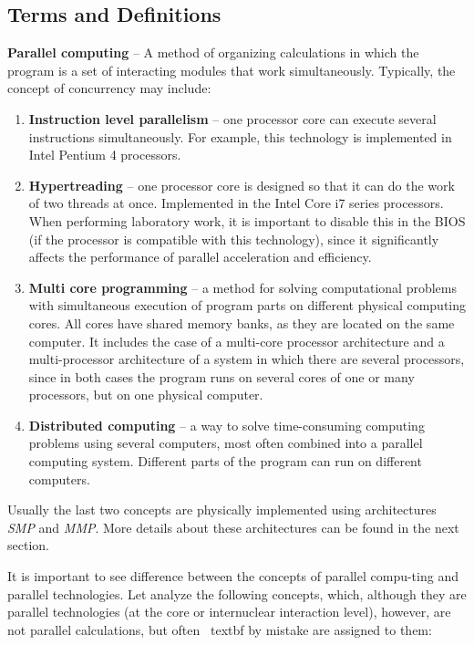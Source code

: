 { %
	\subsection{Terms and Definitions}
	\par\textbf{Parallel computing} – 
A method of organizing calculations in which the program is a set of interacting modules that work simultaneously. Typically, the concept of concurrency may include:
		\begin{enumerate}

			\item\textbf{Instruction level parallelism} – one processor core can execute several instructions simultaneously. For example, this technology is implemented in Intel Pentium 4 processors.
			\item\textbf{Hypertreading} – one processor core is designed so that it can do the work of two threads at once. Implemented in the Intel Core i7 series processors. When performing laboratory work, it is important to disable this in the BIOS (if the processor is compatible with this technology), since it significantly affects the performance of parallel acceleration and efficiency.
			\item\textbf{Multi core programming} –  a method for solving computational problems with simultaneous execution of program parts on different physical computing cores. All cores have shared memory banks, as they are located on the same computer. It includes the case of a multi-core processor architecture and a multi-processor architecture of a system in which there are several processors, since in both cases the program runs on several cores of one or many processors, but on one physical computer.
			\item\textbf{Distributed computing} – a way to solve time-consuming computing problems using several computers, most often combined into a parallel computing system. Different parts of the program can run on different computers.
		\end{enumerate}
Usually the last two concepts are physically implemented using architectures \textit{SMP} and \textit{MMP}. More details about these architectures can be found in the next section.
	\par It is important to see difference between the concepts of parallel compu-ting and parallel technologies. Let  analyze the following concepts, which, although they are parallel technologies (at the core or internuclear interaction level), however, are not parallel calculations, but often \ textbf {by mistake} are assigned to them:
}
